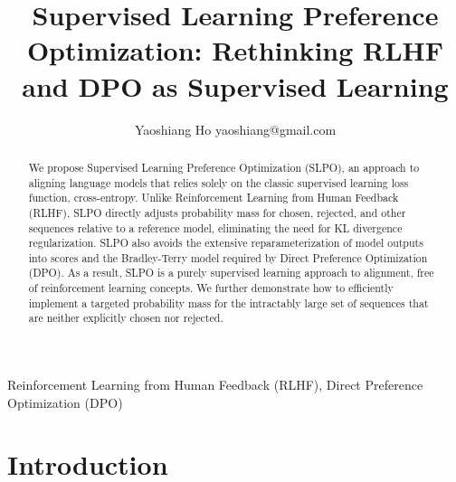 \documentclass[twoside,11pt]{article}
\begin{document}
\title{Supervised Learning Preference Optimization: Rethinking RLHF and DPO as Supervised Learning}

\author{\name Yaoshiang Ho \email yaoshiang@gmail.com \\
      }

\editor{}

\maketitle 

\begin{abstract}%
We propose Supervised Learning Preference Optimization (SLPO), 
an approach to aligning language models that relies solely on the
classic supervised learning loss function, cross-entropy. 
Unlike Reinforcement Learning from Human Feedback (RLHF), 
SLPO directly adjusts probability mass for chosen, rejected, 
and other sequences relative to a reference model, 
eliminating the need for KL divergence regularization. 
SLPO also avoids the extensive reparameterization of model outputs 
into scores and the Bradley-Terry model required by 
Direct Preference Optimization (DPO). 
As a result, SLPO is a purely supervised learning approach 
to alignment, free of reinforcement learning concepts. 
We further demonstrate how to efficiently implement
a targeted probability mass for the 
intractably large set of sequences that are neither explicitly 
chosen nor rejected. 

\end{abstract}

\begin{keywords}
  Reinforcement Learning from Human Feedback (RLHF), 
  Direct Preference Optimization (DPO)
\end{keywords}

\section{Introduction}
\end{document}
